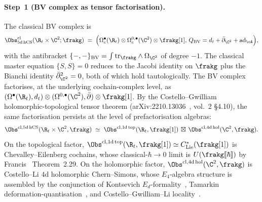\paragraph{Step~1 (BV complex as tensor factorisation).}
The classical BV complex is
\begin{equation}
\label{eq:bv-complex-tensor}
  \Obs^{\mathrm{cl}}_{5\mathrm{d\,hCS}}(\R_t\times\C^2;\frakg)
  \;=\; \Bigl( \Omega^\bullet_c(\R_t) \otimes \Omega^{0,\bullet}_c(\C^2)\otimes \frakg[1],\,
  Q_{\mathrm{BV}} = d_t + \bar\partial_{\C^2} + \mathrm{ad}_{\cA}\Bigr),
\end{equation}
with the antibracket
$\{-,-\}_{\mathrm{BV}} = \int\mathrm{tr}_\frakg\wedge\Omega_{\C^2}$ of
degree $-1$. The classical master equation $\{S,S\} = 0$ reduces to the
Jacobi identity on $\frakg$ plus the
Bianchi identity $\bar\partial_{\C^2}^2 = 0$, both of which hold
tautologically. The BV complex factorises, at the underlying
cochain-complex level, as
$(\Omega^\bullet(\R_t),d_t)\otimes (\Omega^{0,\bullet}(\C^2),\bar\partial)\otimes \frakg[1]$.
By the Costello--Gwilliam holomorphic-topological tensor theorem
(arXiv:2210.13036~\cite{CostelloGwilliam}, vol.~2 §4.10), the same
factorisation persists at the level of prefactorisation algebras:
\begin{equation}
\label{eq:obs-tensor-factorisation}
  \Obs^{\mathrm{cl},5\mathrm{d\,hCS}}(\R_t\times\C^2,\frakg)
  \;\simeq\;
  \Obs^{\mathrm{cl},1\mathrm{d\,top}}(\R_t,\frakg[1])\,\boxtimes\,
  \Obs^{\mathrm{cl},4\mathrm{d\,hol}}(\C^2,\frakg).
\end{equation}
On the topological factor, $\Obs^{\mathrm{cl},1\mathrm{d\,top}}(\R_t,\frakg[1])
\simeq C^*_{\mathrm{Lie}}(\frakg[1])$ is Chevalley--Eilenberg cochains,
whose classical-$\hbar\to 0$ limit is $U(\frakg[\![\hbar]\!])$ by
Francis~\cite{Francis2013} Theorem~2.29. On the holomorphic factor,
$\Obs^{\mathrm{cl},4\mathrm{d\,hol}}(\C^2,\frakg)$ is Costello--Li
$4$d holomorphic Chern--Simons, whose $E_4$-algebra structure is
assembled by the conjunction of Kontsevich $E_d$-formality~\cite{Kontsevich1999},
Tamarkin deformation-quantisation~\cite{Tamarkin2007}, and
Costello--Gwilliam--Li locality~\cite{CostelloLi2020,CostelloGwilliam}.

